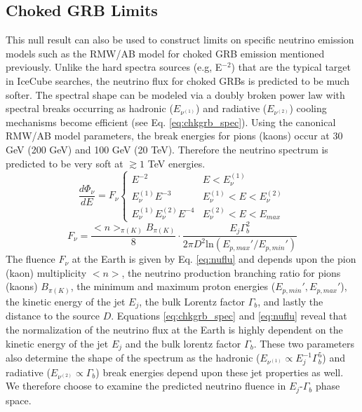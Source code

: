 \documentclass[manuscript]{aastex}
\begin{document}
\subsection{Choked GRB Limits}
This null result can also be used to construct limits on specific neutrino emission models such as the RMW/AB model for choked GRB emission mentioned previously. Unlike the hard spectra sources (e.g, E$^{-2}$) that are the typical target in IceCube searches, the neutrino flux for choked GRBs is predicted to be much softer. The spectral shape can be modeled via a doubly broken power law with spectral breaks occurring as hadronic ($E_{\nu^{(1)}}$) and radiative ($E_{\nu^{(2)}}$) cooling mechanisms become efficient (see Eq. \ref{eq:chkgrb_spec}). Using the canonical RMW/AB model parameters, the break energies for pions (kaons) occur at 30 GeV (200 GeV) and 100 GeV (20 TeV). Therefore the neutrino spectrum is predicted to be very soft at $\gtrsim 1$ TeV energies.
\begin{equation}\label{eq:chkgrb_spec}
\frac{d\Phi_\nu}{dE}=F_\nu\left\{\begin{array}{cc}
E^{-2} & E < E_{\nu}^{(1)} \\ 
E_{\nu}^{(1)}E^{-3} & E_{\nu}^{(1)}< E < E_{\nu}^{(2)} \\ 
E_{\nu}^{(1)}E_{\nu}^{(2)}E^{-4} & E_{\nu}^{(2)}< E < E_{max}
\end{array}\right.
\end{equation}
\begin{equation}\label{eq:nuflu}
F_{\nu} = \frac{<n>_{\pi(K)}B_{\pi(K)}}{8} \cdot \frac{E_j \Gamma_b^2}{2 \pi D^2 \textrm{ln}(E_{p,max}'/ E_{p,min}')}
\end{equation}
The fluence $F_\nu$ at the Earth is given by Eq. \ref{eq:nuflu} and depends upon the pion (kaon) multiplicity $<n>$, the neutrino production branching ratio for pions (kaons) $B_{\pi(K)}$, the minimum and maximum proton energies ($E_{p,min}', E_{p,max}'$), the kinetic energy of the jet $E_j$, the bulk Lorentz factor $\Gamma_b$, and lastly the distance to the source $D$. Equations \ref{eq:chkgrb_spec} and \ref{eq:nuflu} reveal that the normalization of the neutrino flux at the Earth is highly dependent on the kinetic energy of the jet $E_j$ and the bulk lorentz factor $\Gamma_b$. These two parameters also determine the shape of the spectrum as the hadronic ($E_{\nu^{(1)}}\propto E_j^{-1} \Gamma_b^5$) and radiative ($E_{\nu^{(2)}}\propto \Gamma_b$) break energies depend upon these jet properties as well. We therefore choose to examine the predicted neutrino fluence in $E_j$-$\Gamma_b$ phase space. 
\end{document}
